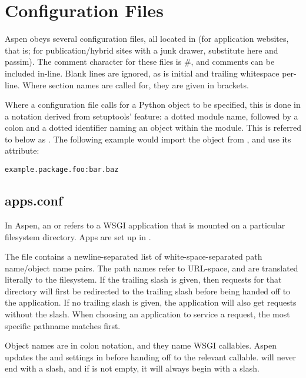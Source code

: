 \section{Configuration Files \label{config-files}}

Aspen obeys several configuration files, all located in  (for
application websites, that is; for publication/hybrid sites with a junk drawer,
substitute  here and passim). The comment character for these files
is \#, and comments can be included in-line. Blank lines are ignored, as is
initial and trailing whitespace per-line. Where section names are called for,
they are given in brackets.

Where a configuration file calls for a Python object to be specified, this is
done in a notation derived from setuptools'  feature: a dotted
module name, followed by a colon and a dotted identifier naming an object within
the module. This is referred to below as . The following
example would import the  object from , and
use its  attribute:

\begin{verbatim}
example.package.foo:bar.baz
\end{verbatim}




\subsection{apps.conf}
\label{apps-conf}

In Aspen, an  or  refers to a WSGI application that is
mounted on a particular filesystem directory. Apps are set up in
.

The  file contains a newline-separated list of
white-space-separated path name/object name pairs. The path names refer to
URL-space, and are translated literally to the filesystem. If the trailing slash
is given, then requests for that directory will first be redirected to the
trailing slash before being handed off to the application. If no trailing slash
is given, the application will also get requests without the slash. When
choosing an application to service a request, the most specific pathname matches
first.

Object names are in colon notation, and they name WSGI callables. Aspen updates
the  and  settings in  before
handing off to the relevant callable.  will never end with a
slash, and if  is not empty, it will always begin with a slash.

